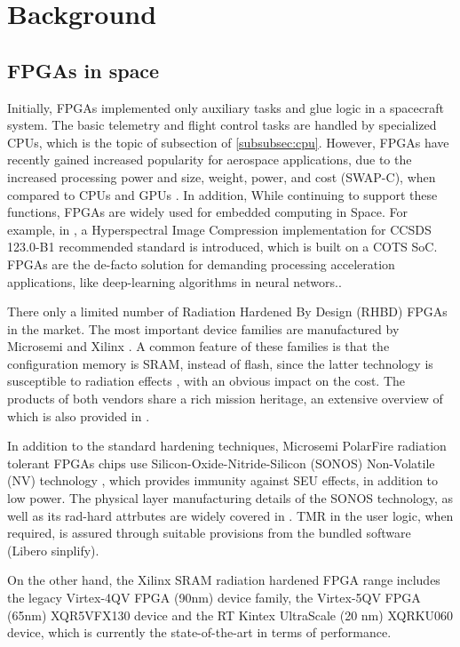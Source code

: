 \section{Background}
\label{sec:background}
\subsection{FPGAs in space}\label{subsubsec:fpga}
Initially, FPGAs implemented only auxiliary tasks and glue logic in a spacecraft system. The basic telemetry and flight control tasks are handled by specialized CPUs, which is the topic of subsection of \ref{subsubsec:cpu}. However, FPGAs have recently gained increased popularity for aerospace applications, due to the increased processing power and size, weight, power, and cost (SWAP-C), when compared to CPUs and GPUs \cite{Lentaris2018}. In addition,  While continuing to support these functions, FPGAs are widely used for embedded computing in Space. For example, in \cite{Tsigkanos2020}, a Hyperspectral Image Compression implementation for CCSDS 123.0-B1 recommended standard is introduced, which is built on a COTS SoC. FPGAs are the de-facto solution for demanding processing acceleration applications, like deep-learning algorithms in neural networs.\cite{Vidmar2021}.\par
There only a limited number of Radiation Hardened By Design (RHBD) FPGAs in the market. The most important device families are manufactured by Microsemi and Xilinx \cite{leon21}. A common feature of these families is that the configuration memory is SRAM, instead of flash, since the latter technology is susceptible to radiation effects \cite{Marinella21}, with an obvious impact on the cost. The products of both vendors share a rich mission heritage, an extensive overview of which is also provided in \cite{leon21}.\par
In addition to the standard hardening techniques, Microsemi PolarFire radiation tolerant FPGAs chips use Silicon-Oxide-Nitride-Silicon (SONOS) Non-Volatile (NV) technology \cite{sonos}, which provides immunity against SEU effects, in addition to low power. The physical layer manufacturing details of the SONOS technology, as well as its rad-hard attrbutes are widely covered in \cite{sonos}. TMR in the user logic, when required, is assured through suitable provisions from the bundled software (Libero sinplify).\par
On the other hand, the Xilinx SRAM radiation hardened FPGA range includes the legacy Virtex-4QV FPGA (90nm) device family, the Virtex-5QV FPGA (65nm) XQR5VFX130 device and the RT Kintex UltraScale (20 nm) XQRKU060 device, which is currently the state-of-the-art in terms of performance.\par
